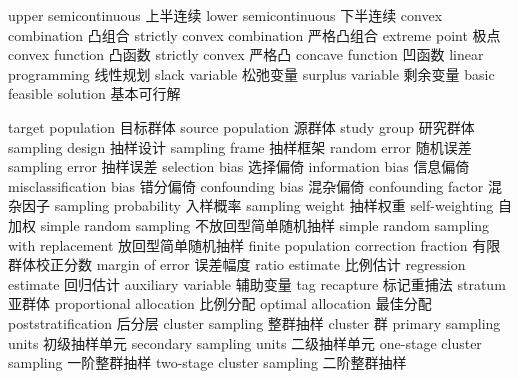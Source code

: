 {upper semicontinuous} 
{上半连续}
{lower semicontinuous} 
{下半连续}
{convex combination} 
{凸组合}
{strictly convex combination} 
{严格凸组合}
{extreme point} 
{极点}
{convex function} 
{凸函数}
{strictly convex} 
{严格凸}
{concave function} 
{凹函数}
{linear programming} 
{线性规划}
{slack variable} 
{松弛变量}
{surplus variable} 
{剩余变量}
{basic feasible solution} 
{基本可行解}


{target population} 
{目标群体}
{source population} 
{源群体}
{study group} 
{研究群体}
{sampling design} 
{抽样设计}
{sampling frame} 
{抽样框架}
{random error} 
{随机误差}
{sampling error} 
{抽样误差}
{selection bias} 
{选择偏倚}
{information bias} 
{信息偏倚}
{misclassification bias} 
{错分偏倚}
{confounding bias} 
{混杂偏倚}
{confounding factor} 
{混杂因子}
{sampling probability} 
{入样概率}
{sampling weight} 
{抽样权重}
{self-weighting} 
{自加权}
{simple random sampling} 
{不放回型简单随机抽样}
{simple random sampling with replacement} 
{放回型简单随机抽样}
{finite population correction fraction} 
{有限群体校正分数}
{margin of error} 
{误差幅度}
{ratio estimate} 
{比例估计}
{regression estimate} 
{回归估计}
{auxiliary variable} 
{辅助变量}
{tag recapture} 
{标记重捕法}
{stratum} 
{亚群体}
{proportional allocation} 
{比例分配}
{optimal allocation} 
{最佳分配}
{poststratification} 
{后分层}
{cluster sampling} 
{整群抽样}
{cluster} 
{群}
{primary sampling units} 
{初级抽样单元}
{secondary sampling units} 
{二级抽样单元}
{one-stage cluster sampling} 
{一阶整群抽样}
{two-stage cluster sampling} 
{二阶整群抽样}

